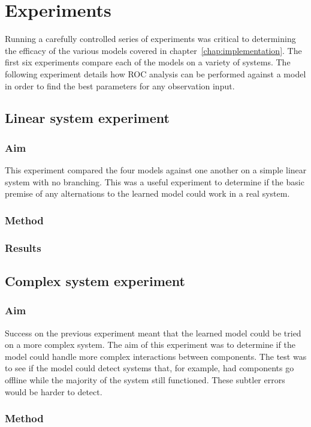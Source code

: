\chapter{Experiments}
\label{chap:experiments}

Running a carefully controlled series of experiments was critical to
determining the efficacy of the various models covered in
chapter~\ref{chap:implementation}. The first six experiments compare
each of the models on a variety of systems. The following experiment
details how ROC analysis can be performed against a model in order to
find the best parameters for any observation input.

\section{Linear system experiment}
\subsection{Aim}
This experiment compared the four models against one another on a
simple linear system with no branching. This was a useful experiment
to determine if the basic premise of any alternations to the learned
model could work in a real system.

\subsection{Method}
\subsection{Results}

\section{Complex system experiment}
\subsection{Aim}
Success on the previous experiment meant that the learned model could
be tried on a more complex system. The aim of this experiment was to
determine if the model could handle more complex interactions between
components. The test was to see if the model could detect systems
that, for example, had components go offline while the majority of the
system still functioned. These subtler errors would be harder to
detect.

\subsection{Method}
